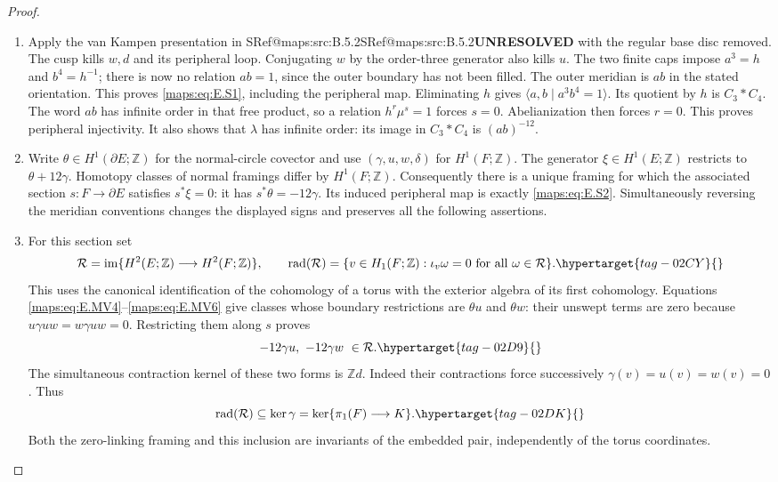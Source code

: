 \documentclass[11pt,a4paper]{article}
\makeatletter
\numberwithin{equation}{section}
\theoremstyle{definition}
\newcommand{\SeriesRefText}[1]{\ifcsname SRef@#1\endcsname\csname SRef@#1\endcsname\else\textbf{UNRESOLVED}\fi}
\newcommand{\SeriesRef}[1]{\ifmmode\text{\SeriesRefText{#1}}\else\SeriesRefText{#1}\fi}
\makeatother
\begin{document}
\begin{proof}
\begin{enumerate}[label=\arabic*.,leftmargin=*]
\item Apply the van Kampen presentation in \SeriesRef{maps:src:B.5.2} with the regular base disc
removed. The cusp kills $w,d$ and its peripheral loop. Conjugating
$w$ by the order-three generator also kills $u$. The two finite caps
impose $a^3=h$ and $b^4=h^{-1}$; there is now no relation $ab=1$,
since the outer boundary has not been filled. The outer meridian
is $ab$ in the stated orientation. This proves \eqref{maps:eq:E.S1}, including the peripheral map. Eliminating $h$ gives $\langle a,b\mid a^3b^4=1\rangle$.
Its quotient by $h$ is $C_3*C_4$. The word $ab$ has infinite order
in that free product, so a relation $h^r\mu^s=1$ forces $s=0$.
Abelianization then forces $r=0$. This proves peripheral injectivity.
It also shows that $\lambda$ has infinite order: its image in
$C_3*C_4$ is $(ab)^{-12}$.

\item Write $\theta\in H^1(\partial E;\mathbb Z)$ for the normal-circle
covector and use $(\gamma,u,w,\delta)$ for $H^1(F;\mathbb Z)$.
The generator $\xi\in H^1(E;\mathbb Z)$ restricts to
$\theta+12\gamma$. Homotopy classes of normal framings differ by
$H^1(F;\mathbb Z)$. Consequently there is a unique framing for
which the associated section $s:F\to\partial E$ satisfies
$s^*\xi=0$: it has $s^*\theta=-12\gamma$. Its induced peripheral
map is exactly \eqref{maps:eq:E.S2}. Simultaneously reversing the meridian
conventions changes the displayed signs and preserves all the
following assertions.

\item For this section set
\begin{equation}
 \mathcal R=\operatorname{im}\{H^2(E;\mathbb Z)
                         \longrightarrow H^2(F;\mathbb Z)\},
 \qquad
 \operatorname{rad}(\mathcal R)=
 \{v\in H_1(F;\mathbb Z):\iota_v\omega=0
                                    \text{ for all }\omega\in\mathcal R\}.
 \hypertarget{tag-02CY}{}\label{maps:eq:E.S3}
\end{equation}
This uses the canonical identification of the cohomology of a torus
with the exterior algebra of its first cohomology. Equations
\eqref{maps:eq:E.MV4}--\eqref{maps:eq:E.MV6} give classes whose boundary restrictions are
$\theta u$ and $\theta w$: their unswept terms are zero because
$u\gamma uw=w\gamma uw=0$. Restricting them along $s$ proves
\begin{equation}
                -12\gamma u,\ -12\gamma w\ \in\mathcal R.
 \hypertarget{tag-02D9}{}\label{maps:eq:E.S4}
\end{equation}
The simultaneous contraction kernel of these two forms is
$\mathbb Z d$. Indeed their contractions force successively
$\gamma(v)=u(v)=w(v)=0$. Thus
\begin{equation}
       \operatorname{rad}(\mathcal R)\subseteq\ker\gamma
        =\ker\{\pi_1(F)\longrightarrow K\}.
 \hypertarget{tag-02DK}{}\label{maps:eq:E.S5}
\end{equation}
Both the zero-linking framing and this inclusion are invariants of
the embedded pair, independently of the torus coordinates.


\end{enumerate}
\end{proof}
\end{document}
